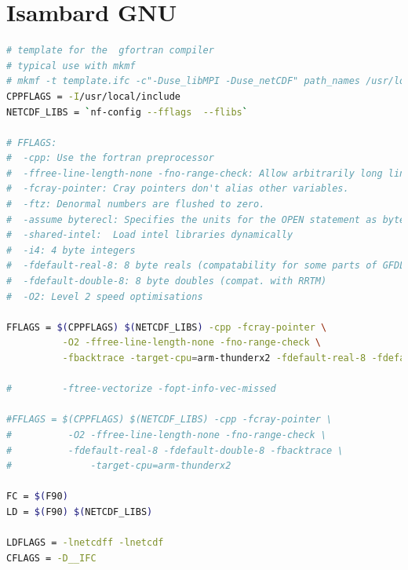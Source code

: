 \documentclass[a4paper,11pt]{report}
\newcommand{\toclesssection}[1]{\section{#1}\addtocounter{section}{1}}
\begin{document}
\toclesssection{Isambard GNU}

\begin{lstlisting}[language=bash]
# template for the  gfortran compiler
# typical use with mkmf
# mkmf -t template.ifc -c"-Duse_libMPI -Duse_netCDF" path_names /usr/local/include
CPPFLAGS = -I/usr/local/include
NETCDF_LIBS = `nf-config --fflags  --flibs`

# FFLAGS:
#  -cpp: Use the fortran preprocessor
#  -ffree-line-length-none -fno-range-check: Allow arbitrarily long lines
#  -fcray-pointer: Cray pointers don't alias other variables.
#  -ftz: Denormal numbers are flushed to zero.
#  -assume byterecl: Specifies the units for the OPEN statement as bytes.
#  -shared-intel:  Load intel libraries dynamically
#  -i4: 4 byte integers
#  -fdefault-real-8: 8 byte reals (compatability for some parts of GFDL code)
#  -fdefault-double-8: 8 byte doubles (compat. with RRTM)
#  -O2: Level 2 speed optimisations

FFLAGS = $(CPPFLAGS) $(NETCDF_LIBS) -cpp -fcray-pointer \
          -O2 -ffree-line-length-none -fno-range-check \
          -fbacktrace -target-cpu=arm-thunderx2 -fdefault-real-8 -fdefault-double-8

#         -ftree-vectorize -fopt-info-vec-missed

#FFLAGS = $(CPPFLAGS) $(NETCDF_LIBS) -cpp -fcray-pointer \
#          -O2 -ffree-line-length-none -fno-range-check \
#          -fdefault-real-8 -fdefault-double-8 -fbacktrace \
#              -target-cpu=arm-thunderx2 

FC = $(F90)
LD = $(F90) $(NETCDF_LIBS)

LDFLAGS = -lnetcdff -lnetcdf 
CFLAGS = -D__IFC
\end{lstlisting}
\end{document}
